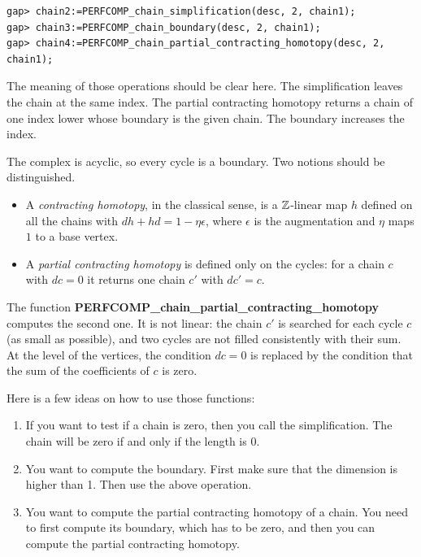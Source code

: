 \documentclass[12pt]{amsart}
\begin{document}
\begin{verbatim}
gap> chain2:=PERFCOMP_chain_simplification(desc, 2, chain1);
gap> chain3:=PERFCOMP_chain_boundary(desc, 2, chain1);
gap> chain4:=PERFCOMP_chain_partial_contracting_homotopy(desc, 2, chain1);
\end{verbatim}
The meaning of those operations should be clear here. The simplification leaves the chain at the same index.
The partial contracting homotopy returns a chain of one index lower whose boundary is the given chain. The boundary increases the index.

The complex is acyclic, so every cycle is a boundary. Two notions should be distinguished.
\begin{itemize}
\item A {\em contracting homotopy}, in the classical sense, is a $\mathbb{Z}$-linear map $h$ defined on all the chains with $dh + hd = 1 - \eta\epsilon$, where $\epsilon$ is the augmentation and $\eta$ maps $1$ to a base vertex.
\item A {\em partial contracting homotopy} is defined only on the cycles: for a chain $c$ with $dc = 0$ it returns one chain $c'$ with $dc' = c$.
\end{itemize}
The function {\bf PERFCOMP\_chain\_partial\_contracting\_homotopy} computes the second one. It is not linear: the chain $c'$ is searched for each cycle $c$ (as small as possible), and two cycles are not filled consistently with their sum. At the level of the vertices, the condition $dc = 0$ is replaced by the condition that the sum of the coefficients of $c$ is zero.

Here is a few ideas on how to use those functions:
\begin{enumerate}
\item If you want to test if a chain is zero, then you call the simplification. The chain will be zero if and only if the length is 0.
\item You want to compute the boundary. First make sure that the dimension is higher than 1. Then use the above operation.
\item You want to compute the partial contracting homotopy of a chain. You need to first compute its boundary, which has to be zero, and then you can compute the partial contracting homotopy.
\end{enumerate}
\end{document}
